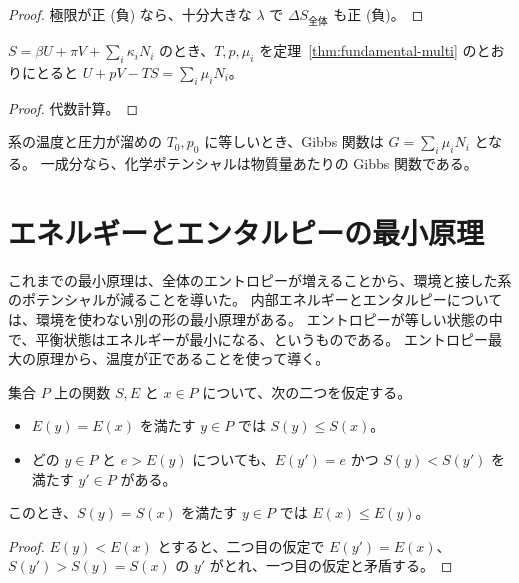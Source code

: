 \begin{proof}
  \leanok
  極限が正 (負) なら、十分大きな $\lambda$ で $\Delta S_{\text{全体}}$ も正 (負)。
\end{proof}

\begin{theorem}
  \label{thm:gibbs-euler}
  \leanok
  $S = \beta U + \pi V + \sum_i \kappa_i N_i$ のとき、$T, p, \mu_i$ を定理~\ref{thm:fundamental-multi} のとおりにとると $U + pV - TS = \sum_i \mu_i N_i$。
\end{theorem}

\begin{proof}
  \leanok
  代数計算。
\end{proof}

系の温度と圧力が溜めの $T_0, p_0$ に等しいとき、Gibbs 関数は $G = \sum_i \mu_i N_i$ となる。
一成分なら、化学ポテンシャルは物質量あたりの Gibbs 関数である。

\section{エネルギーとエンタルピーの最小原理}

これまでの最小原理は、全体のエントロピーが増えることから、環境と接した系のポテンシャルが減ることを導いた。
内部エネルギーとエンタルピーについては、環境を使わない別の形の最小原理がある。
エントロピーが等しい状態の中で、平衡状態はエネルギーが最小になる、というものである。
エントロピー最大の原理から、温度が正であることを使って導く。

\begin{lemma}[最大から最小へ]
  \label{lem:min-of-max}
  \leanok
  集合 $P$ 上の関数 $S, E$ と $x \in P$ について、次の二つを仮定する。
  \begin{itemize}
    \item $E(y) = E(x)$ を満たす $y \in P$ では $S(y) \le S(x)$。
    \item どの $y \in P$ と $e > E(y)$ についても、$E(y') = e$ かつ $S(y) < S(y')$ を満たす $y' \in P$ がある。
  \end{itemize}
  このとき、$S(y) = S(x)$ を満たす $y \in P$ では $E(x) \le E(y)$。
\end{lemma}

\begin{proof}
  \leanok
  $E(y) < E(x)$ とすると、二つ目の仮定で $E(y') = E(x)$、$S(y') > S(y) = S(x)$ の $y'$ がとれ、一つ目の仮定と矛盾する。
\end{proof}

